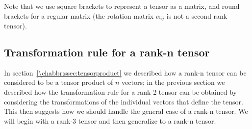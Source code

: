 Note that we use square brackets to represent a tensor as a matrix, and round brackets for a regular matrix (the rotation matrix $\alpha_{ij}$ is not a second rank tensor). 


\subsection{Transformation rule for a rank-n tensor}

In section~\ref{\chabbr:ssec:tensorproduct} we described how a rank-n tensor can be considered to be a tensor product of $n$ vectors; in the previous section we described how the transformation rule for a rank-2 tensor can be obtained by considering the transformations of the individual vectors that define the tensor. This then suggests how we should handle the general case of a rank-n tensor.  We will begin with a rank-3 tensor and then generalize to a rank-n tensor.

